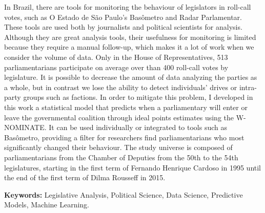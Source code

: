 In Brazil, there are tools for monitoring the behaviour of legislators in
roll-call votes, such as O Estado de São Paulo's Basômetro and Radar
Parlamentar. These tools are used both by journalists and political scientists
for analysis.
 Although they are great analysis tools, their usefulness for monitoring is
limited because they require a manual follow-up, which makes it a lot of work
when we consider the volume of data. Only in the House of Representatives, 513
parliamentarians participate on average over than 400 roll-call votes by
legislature. It is possible to decrease the amount of data analyzing the
parties as a whole, but in contrast we lose the ability to detect individuals'
drives or intra-party groups such as factions.
 In order to mitigate this problem, I developed in this work a statistical
model that predicts when a parliamentary will enter or leave the governmental
coalition through ideal points estimates using the W-NOMINATE. It can be used
individually or integrated to tools such as Basômetro, providing a filter for
researchers find parliamentarians who most significantly changed their
behaviour.
 The study universe is composed of parliamentarians from the Chamber of
Deputies from the 50th to the 54th legislatures, starting in the first term of
Fernando Henrique Cardoso in 1995 until the end of the first term of Dilma
Rousseff in 2015.

\textbf{Keywords:} Legislative Analysis, Political Science, Data Science,
Predictive Models, Machine Learning.
